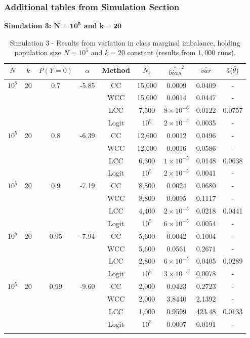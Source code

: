 \subsubsection{Additional tables from Simulation Section}

\textbf{Simulation 3: $\mathbf{N=10^5}$ and $\mathbf{k=20}$}

\begin{longtable}{ccccccccc}
\toprule
$N$ & $k$ & $P(Y=0)$ & $\alpha$ & Method & $N_s$ & $\widehat{bias}^2$ & $\widehat{var}$ & $\Bar{a}(\Tilde{\theta})$\\
\midrule
$10^5$ & 20 & 0.7 & -5.85 & CC & 15,000 & 0.0009 & 0.0409 & - \\
 & & & & WCC & 15,000 & 0.0014 & 0.0447 & - \\
 & & & & LCC & 7,500 & $8\times10^{-6}$ & 0.0122 & 0.0757\\
 & & & & Logit & $10^5$ & $2\times10^{-5}$ & 0.0035 & -\\
 \midrule
$10^5$ & 20 & 0.8 & -6.39 & CC & 12,600  & 0.0012 & 0.0496 & -\\
 & & & & WCC & 12,600 & 0.0016 & 0.0586 & - \\
 & & & & LCC & 6,300 & $1\times10^{-5}$ & 0.0148 & 0.0638 \\
 & & & & Logit & $10^5$ & $2\times10^{-5}$ & 0.0041 & -\\
\midrule
$10^5$ & 20 & 0.9 & -7.19 & CC & 8,800 & 0.0024 & 0.0680 & - \\
 & & & & WCC & 8,800 & 0.0095 & 0.1117 & -\\
 & & & & LCC & 4,400 & $2\times10^{-5}$ & 0.0218 & 0.0441 \\
 & & & & Logit & $10^5$ & $6\times10^{-5}$ & 0.0054 & -\\
 \midrule
$10^5$ & 20 & 0.95 & -7.94 & CC & 5,600 & 0.0042 & 0.1004 & - \\
 & & & & WCC & 5,600 & 0.0561 & 0.2671 & -\\
 & & & & LCC & 2,800 & $6\times10^{-5}$ & 0.0405 & 0.0289 \\
 & & & & Logit & $10^5$ & $3\times10^{-5}$ & 0.0078 & -\\
 \midrule
$10^5$ & 20 & 0.99 & -9.60 & CC & 2,000 & 0.0423 & 0.2723 & - \\
 & & & & WCC & 2,000 & 3.8440 & 2.1392 & -\\
 & & & & LCC & 1,000 & 0.9599 & 423.48 & 0.0133 \\
 & & & & Logit & $10^5$ & 0.0007 & 0.0191 & -\\
\bottomrule
\caption[Simulation 3 - Increasing marginal imbalance for $N=10^5$ and $k=20$]{Simulation 3 - Results from variation in class marginal imbalance, holding population size $N=10^5$ and $k=20$ constant (results from $1,000$ runs).}
\label{tab:sim_prob_a3}
\end{longtable}


